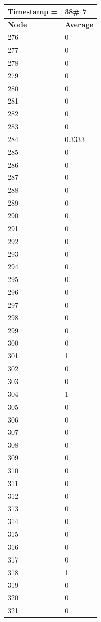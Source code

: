 \begin{tabular}{|l||l|}
\hline
\textbf{Timestamp =} & \textbf{38}\# 7\\\hline
	\textbf{Node} & \textbf{Average} \\ \hline
\hline
	276 & 0 \\ \hline
	277 & 0 \\ \hline
	278 & 0 \\ \hline
	279 & 0 \\ \hline
	280 & 0 \\ \hline
	281 & 0 \\ \hline
	282 & 0 \\ \hline
	283 & 0 \\ \hline
	284 & 0.3333 \\ \hline
	285 & 0 \\ \hline
	286 & 0 \\ \hline
	287 & 0 \\ \hline
	288 & 0 \\ \hline
	289 & 0 \\ \hline
	290 & 0 \\ \hline
	291 & 0 \\ \hline
	292 & 0 \\ \hline
	293 & 0 \\ \hline
	294 & 0 \\ \hline
	295 & 0 \\ \hline
	296 & 0 \\ \hline
	297 & 0 \\ \hline
	298 & 0 \\ \hline
	299 & 0 \\ \hline
	300 & 0 \\ \hline
	301 & 1 \\ \hline
	302 & 0 \\ \hline
	303 & 0 \\ \hline
	304 & 1 \\ \hline
	305 & 0 \\ \hline
	306 & 0 \\ \hline
	307 & 0 \\ \hline
	308 & 0 \\ \hline
	309 & 0 \\ \hline
	310 & 0 \\ \hline
	311 & 0 \\ \hline
	312 & 0 \\ \hline
	313 & 0 \\ \hline
	314 & 0 \\ \hline
	315 & 0 \\ \hline
	316 & 0 \\ \hline
	317 & 0 \\ \hline
	318 & 1 \\ \hline
	319 & 0 \\ \hline
	320 & 0 \\ \hline
	321 & 0 \\ \hline
\end{tabular}
